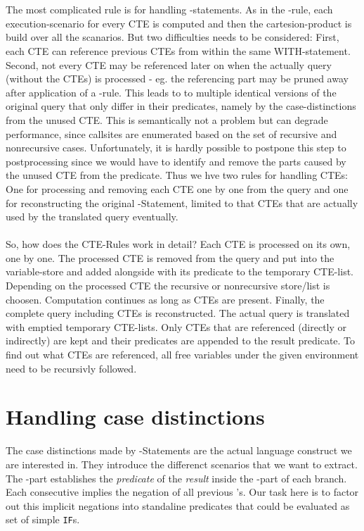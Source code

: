 \\\\
The most complicated rule is for handling \WITH-statements. As in the \REXPR-rule, each execution-scenario for every CTE is computed and then the cartesion-product is build over all the scanarios. But two difficulties needs to be considered: First, each CTE can reference previous CTEs from within the same WITH-statement. Second, not every CTE may be referenced later on when the actually query (without the CTEs) is processed - eg. the referencing part may be pruned away after application of a \RWHEN-rule. This leads to to multiple identical versions of the original query that only differ in their predicates, namely by the case-distinctions from the unused CTE. This is semantically not a problem but can degrade performance, since callsites are enumerated based on the set of recursive and nonrecursive cases. Unfortunately, it is hardly possible to postpone this step to postprocessing since we would have to identify and remove the parts caused by the unused CTE from the predicate. Thus we hve two rules for handling CTEs: One for processing and removing each CTE one by one from the query and one for reconstructing the original \WITH-Statement, limited to that CTEs that are actually used by the translated query eventually.
\\\\
So, how does the CTE-Rules work in detail? Each CTE is processed on its own, one by one. The processed CTE is removed from the query and put into the variable-store and added alongside with its predicate to the temporary CTE-list. Depending on the processed CTE the recursive or nonrecursive store/list is choosen. Computation continues as long as CTEs are present. Finally, the complete query including CTEs is reconstructed. The actual query is translated with emptied temporary CTE-lists. Only CTEs that are referenced (directly or indirectly) are kept and their predicates are appended to the result predicate. To find out what CTEs are referenced, all free variables under the given environment need to be recursivly followed.

\section{Handling case distinctions}
The case distinctions made by \CASE-Statements are the actual language construct we are interested in. They introduce the differenct scenarios that we want to extract. The \WHEN-part establishes the \textit{predicate} of the \textit{result} inside the \THEN-part of each branch. Each consecutive \WHEN implies the negation of all previous \WHEN's. Our task here is to factor out this implicit negations into standaline predicates that could be evaluated as set of simple \texttt{IF}s.

